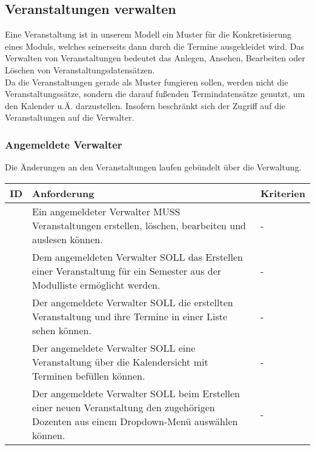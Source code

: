 \newpage

\subsection{Veranstaltungen verwalten}
Eine Veranstaltung ist in unserem Modell ein Muster für die Konkretisierung eines Moduls, welches seinerseits dann durch die Termine ausgekleidet wird. Das Verwalten von Veranstaltungen 
bedeutet das Anlegen, Ansehen, Bearbeiten oder Löschen von Veranstaltungsdatensätzen.\\
Da die Veranstaltungen gerade als Muster fungieren sollen,  werden nicht die Veranstaltungssätze, sondern die darauf fußenden Termindatensätze genutzt, um den Kalender u.Ä. darzustellen. Insofern beschränkt sich der Zugriff auf die Veranstaltungen auf die Verwalter.


\subsubsection{Angemeldete Verwalter }
Die Änderungen an den Veranstaltungen laufen gebündelt über die Verwaltung.
\begin{tabular} {|p{}|p{}|p{}|}
	\hline
	ID & Anforderung & Kriterien \\
	\hline
	\printfreqnr
	& Ein angemeldeter Verwalter MUSS Veranstaltungen erstellen, löschen, bearbeiten und auslesen können.
	& - \\
	\hline
	\printfreqnr
	& Dem angemeldeten Verwalter SOLL das Erstellen einer Veranstaltung für ein Semester aus der Modulliste ermöglicht werden.
	& - \\
	\hline
	\printfreqnr
	& Der angemeldete Verwalter SOLL die erstellten Veranstaltung und ihre Termine in einer Liste sehen können. 
	& - \\
	\hline
	\printfreqnr
	& Der angemeldete Verwalter SOLL eine Veranstaltung über die Kalendersicht mit Terminen befüllen können.
	& - \\
	\hline
	\printfreqnr
	& Der angemeldete Verwalter SOLL beim Erstellen einer neuen Veranstaltung den zugehörigen Dozenten aus einem Dropdown-Menü auswählen können.
	& - \\
	\hline
\end{tabular}

\newpage

